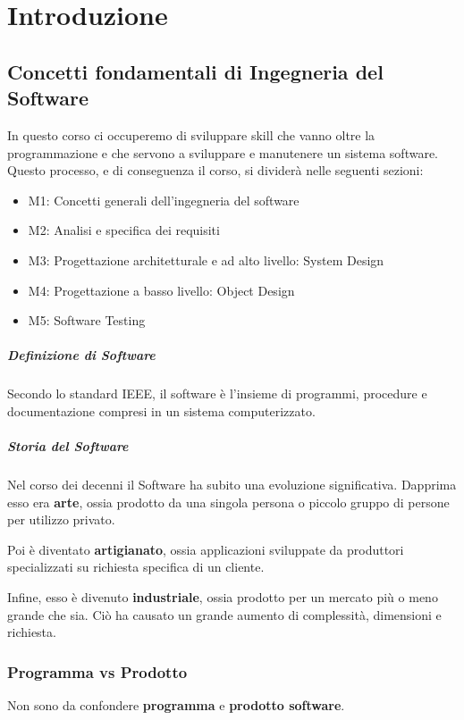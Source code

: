 \chapter{Introduzione}

\section{Concetti fondamentali di Ingegneria del Software}
    In questo corso ci occuperemo di sviluppare skill che vanno oltre la programmazione e che servono a sviluppare e manutenere un sistema software.
    Questo processo, e di conseguenza il corso, si dividerà nelle seguenti sezioni:
    \begin{itemize}
        \item M1: Concetti generali dell'ingegneria del software
        \item M2: Analisi e specifica dei requisiti
        \item M3: Progettazione architetturale e ad alto livello: System Design
        \item M4: Progettazione a basso livello: Object Design
        \item M5: Software Testing
    \end{itemize}
    
    \paragraph{Definizione di Software} Secondo lo standard IEEE, il software è l'insieme di programmi, procedure e documentazione compresi in un sistema computerizzato.

    \paragraph{Storia del Software}Nel corso dei decenni il Software ha subito una evoluzione significativa.
    Dapprima esso era \textbf{arte}, ossia prodotto da una singola persona o piccolo gruppo di persone per utilizzo privato.
    
    Poi è diventato \textbf{artigianato}, ossia applicazioni sviluppate da produttori specializzati su richiesta specifica di un cliente.
    
    Infine, esso è divenuto \textbf{industriale}, ossia prodotto per un mercato più o meno grande che sia. Ciò ha causato un grande aumento di complessità, dimensioni e richiesta.
    
\subsection{Programma vs Prodotto}
    Non sono da confondere \textbf{programma} e \textbf{prodotto software}.
    
